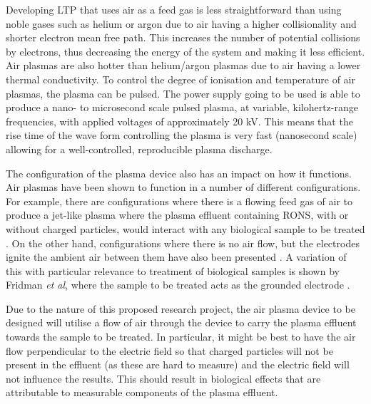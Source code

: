 \documentclass[11pt, oneside]{article}   	%
\begin{document}
Developing LTP that uses air as a feed gas is less straightforward than using noble gases such as helium or argon due to air having a higher collisionality and shorter electron mean free path.
This increases the number of potential collisions by electrons, thus decreasing the energy of the system and making it less efficient.
Air plasmas are also hotter than helium/argon plasmas due to air having a lower thermal conductivity.
To control the degree of ionisation and temperature of air plasmas, the plasma can be pulsed.
The power supply going to be used is able to produce a nano- to microsecond scale pulsed plasma, at variable, kilohertz-range frequencies, with applied voltages of approximately 20 kV. 
This means that the rise time of the wave form controlling the plasma is very fast (nanosecond scale) allowing for a well-controlled, reproducible plasma discharge.

The configuration of the plasma device also has an impact on how it functions.
Air plasmas have been shown to function in a number of different configurations.
For example, there are configurations where there is a flowing feed gas of air to produce a jet-like plasma where the plasma effluent containing RONS, with or without charged particles, would interact with any biological sample to be treated \cite{Kolb2008cold, Chen2009blood}.
On the other hand, configurations where there is no air flow, but the electrodes ignite the ambient air between them have also been presented \cite{Laroussi2004evaluation}. A variation of this with particular relevance to treatment of biological samples is shown by Fridman \textit{et al}, where the sample to be treated acts as the grounded electrode \cite{Fridman2007floating}.

Due to the nature of this proposed research project, the air plasma device to be designed will utilise a flow of air through the device to carry the plasma effluent towards the sample to be treated.
In particular, it might be best to have the air flow perpendicular to the electric field so that charged particles will not be present in the effluent (as these are hard to measure) and the electric field will not influence the results.
This should result in biological effects that are attributable to measurable components of the plasma effluent.
\end{document}
